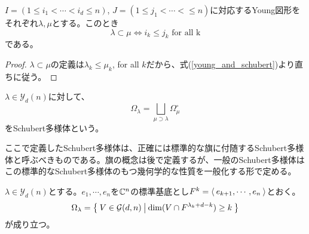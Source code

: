\documentclass{ltjsreport}
\begin{document}
\begin{prop}
  $I=(1\leq i_1<\cdots<i_d\leq n)$, $J=(1\leq j_1<\cdots<\leq n)$に対応するYoung図形をそれぞれ$\lambda,\mu$とする。このとき
  \[
  \lambda\subset\mu\Leftrightarrow i_k\leq j_k\text{ for all k}  
  \]
  である。
\end{prop}

\begin{proof}
  $\lambda\subset\mu$の定義は$\lambda_k\leq\mu_k$, for all $k$だから、式(\ref{young_and_schubert})より直ちに従う。
\end{proof}



\begin{defin}[標準的な旗に付随するShubert多様体]
  $\lambda\in\mathcal{Y}_d(n)$に対して、
  \[
  \Omega_\lambda=\bigsqcup_{\mu\supset\lambda}\Omega^\circ_\mu
  \]
  をSchubert多様体という。
\end{defin}

ここで定義したSchubert多様体は、正確には標準的な旗に付随するSchubert多様体と呼ぶべきものである。旗の概念は後で定義するが、一般のSchubert多様体はこの標準的なSchubert多様体のもつ幾何学的な性質を一般化する形で定める。

\begin{prop}\label{schubert_var}
  $\lambda\in\mathcal{Y}_d(n)$とする。$e_1,\cdots,e_n$を$\mathbb{C}^n$の標準基底とし$F^k=\langle\:e_{k+1},\cdots,e_n\:\rangle$とおく。
  \[
  \Omega_{\lambda}=\left\{\:V\in\mathcal{G}(d,n)\:\middle|\:\dim(V\cap F^{\lambda_k+d-k})\geq k\:\right\}  
  \]
  が成り立つ。
\end{prop}
\end{document}
